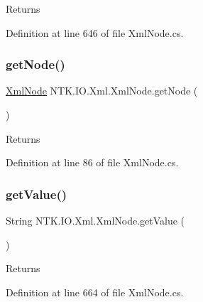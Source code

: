 \begin{DoxyReturn}{Returns}

\end{DoxyReturn}


Definition at line 646 of file Xml\+Node.\+cs.

\mbox{\label{class_n_t_k_1_1_i_o_1_1_xml_1_1_xml_node_afffa099c55bd6b0a5d01ab971c650225}} 
\subsubsection{\texorpdfstring{getNode()}{getNode()}}
{\footnotesize\ttfamily \mbox{\hyperlink{class_n_t_k_1_1_i_o_1_1_xml_1_1_xml_node}{Xml\+Node}} N\+T\+K.\+I\+O.\+Xml.\+Xml\+Node.\+get\+Node (\begin{DoxyParamCaption}{ }\end{DoxyParamCaption})}





\begin{DoxyReturn}{Returns}

\end{DoxyReturn}


Definition at line 86 of file Xml\+Node.\+cs.

\mbox{\label{class_n_t_k_1_1_i_o_1_1_xml_1_1_xml_node_afec7f764cd63abfc5cd76284604878dd}} 
\subsubsection{\texorpdfstring{getValue()}{getValue()}}
{\footnotesize\ttfamily String N\+T\+K.\+I\+O.\+Xml.\+Xml\+Node.\+get\+Value (\begin{DoxyParamCaption}{ }\end{DoxyParamCaption})}





\begin{DoxyReturn}{Returns}

\end{DoxyReturn}


Definition at line 664 of file Xml\+Node.\+cs.

